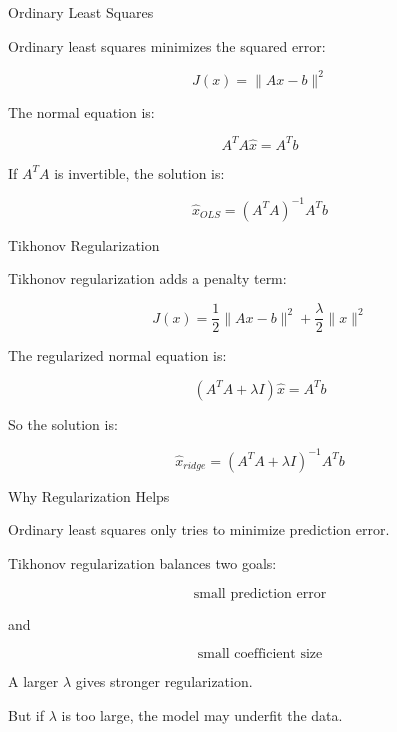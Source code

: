 \documentclass[aspectratio=169]{beamer}
\begin{document}
\begin{frame}{Ordinary Least Squares}

Ordinary least squares minimizes the squared error:

\[
J(x) = \|Ax - b\|^2
\]

The normal equation is:

\[
A^T A \hat{x} = A^T b
\]

If \(A^T A\) is invertible, the solution is:

\[
\hat{x}_{OLS} = (A^T A)^{-1}A^T b
\]

\end{frame}

\begin{frame}{Tikhonov Regularization}

Tikhonov regularization adds a penalty term:

\[
J(x)=\frac{1}{2}\|Ax-b\|^2+\frac{\lambda}{2}\|x\|^2
\]

The regularized normal equation is:

\[
(A^TA+\lambda I)\hat{x}=A^Tb
\]

So the solution is:

\[
\hat{x}_{ridge}=(A^TA+\lambda I)^{-1}A^Tb
\]

\end{frame}

\begin{frame}{Why Regularization Helps}

Ordinary least squares only tries to minimize prediction error.

\medskip

Tikhonov regularization balances two goals:

\[
\text{small prediction error}
\]

and

\[
\text{small coefficient size}
\]

\medskip

A larger \(\lambda\) gives stronger regularization.

\medskip

But if \(\lambda\) is too large, the model may underfit the data.

\end{frame}
\end{document}
